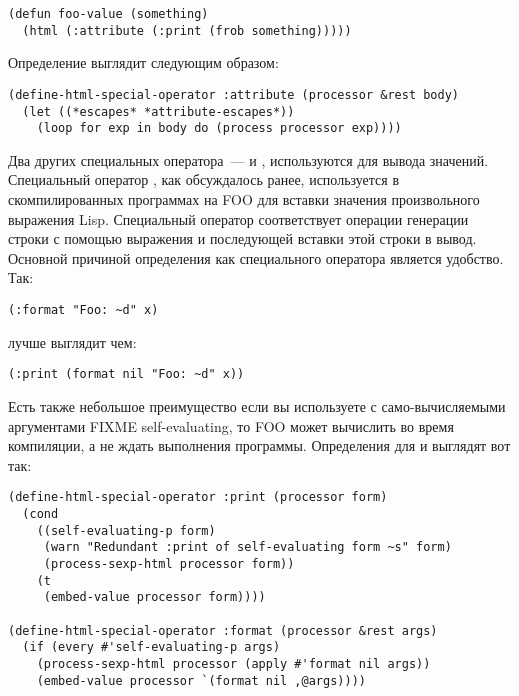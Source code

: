 \begin{lstlisting}
(defun foo-value (something)
  (html (:attribute (:print (frob something)))))
\end{lstlisting}

Определение  выглядит следующим образом:

\begin{lstlisting}
(define-html-special-operator :attribute (processor &rest body)
  (let ((*escapes* *attribute-escapes*))
    (loop for exp in body do (process processor exp))))
\end{lstlisting}

Два других специальных оператора~---  и , используются для
вывода значений.  Специальный оператор , как обсуждалось ранее, используется
в скомпилированных программах на FOO для вставки значения произвольного выражения Lisp.
Специальный оператор  соответствует операции генерации строки с помощью
выражения  и последующей вставки этой строки в вывод.  Основной
причиной определения  как специального оператора является удобство.  Так:

\begin{lstlisting}
(:format "Foo: ~d" x)
\end{lstlisting}

лучше выглядит чем:

\begin{lstlisting}
(:print (format nil "Foo: ~d" x))
\end{lstlisting}

Есть также небольшое преимущество если вы используете  с само-вычисляемыми
аргументами FIXME self-evaluating, то FOO может вычислить  во время
компиляции, а не ждать выполнения программы.  Определения для  и
 выглядят вот так:

\begin{lstlisting}
(define-html-special-operator :print (processor form)
  (cond
    ((self-evaluating-p form)
     (warn "Redundant :print of self-evaluating form ~s" form)
     (process-sexp-html processor form))
    (t
     (embed-value processor form))))

(define-html-special-operator :format (processor &rest args)
  (if (every #'self-evaluating-p args)
    (process-sexp-html processor (apply #'format nil args))
    (embed-value processor `(format nil ,@args))))
\end{lstlisting}

